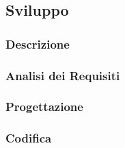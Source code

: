     \subsection{Sviluppo}
        \subsubsection{Descrizione}
        \subsubsection{Analisi dei Requisiti}
        \subsubsection{Progettazione}
        \subsubsection{Codifica}
